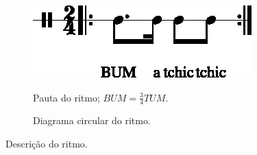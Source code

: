 \begin{figure}[H]
\centering
     \begin{subfigure}[c]{0.45\textwidth}
         \centering
         \href{https://drive.google.com/file/d/1KJRwnra8i78PsBntrbHOclwRoDMdxtp5/view?usp=sharing}{\includegraphics[width=\textwidth]{chapters/cap-musicalidade-percepcion/treino-ritmo3-1.eps}}
         \caption{Pauta do ritmo; $BUM=\frac{3}{4}TUM$.}
         \label{fig:RitmoTUMatchictchic1}
     \end{subfigure}
     \hfill
     \begin{subfigure}[c]{0.45\textwidth}
         \centering
{}
         \caption{Diagrama circular do ritmo.}
         \label{fig:RitmoTUMatchictchic2}
     \end{subfigure}
\caption{Descrição do ritmo.}
\label{fig:abc-percepcionritmica3}
\end{figure}


